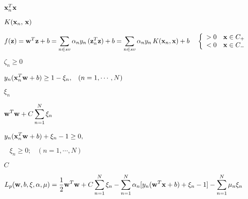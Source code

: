 \documentclass{article}
\def\lthtmlcheckvsize{\ifdim\ht\sizebox<\vsize 
  \ifdim\wd\sizebox<\hsize\expandafter\hfill\fi \expandafter\vfill
  \else\expandafter\vss\fi}%
\begin{document}
{\newpage\clearpage
{}%
$ {\bf x}^T_n{\bf x}$%
\lthtmlindisplaymathZ
\lthtmlcheckvsize\clearpage}

{\newpage\clearpage
{}%
$ K({\bf x}_n,\,{\bf x})$%
\lthtmlindisplaymathZ
\lthtmlcheckvsize\clearpage}

{\newpage\clearpage
{}%
$\displaystyle f({\bf z})={\bf w}^T{\bf z}+b
=\sum_{n\in sv}\alpha_ny_n\,({\bf z}_n^T{\bf z})+b
=\sum_{n\in sv}\alpha_ny_n\,K({\bf x}_n,{\bf x})+b\;\;\;\;
\left\{\begin{array}{ll}>0 & {\bf x}\in C_+\\<0 & {\bf x}\in C_-
\end{array}\right.$%
\lthtmlindisplaymathZ
\lthtmlcheckvsize\clearpage}

{\newpage\clearpage
{}%
$ \zeta_n \ge 0$%
\lthtmlindisplaymathZ
\lthtmlcheckvsize\clearpage}

{\newpage\clearpage
{}%
$\displaystyle y_n ({\bf x}_n^T{\bf w} +b) \ge 1-\xi_n,\;\;\;(n=1,\cdots,N)$%
\lthtmlindisplaymathZ
\lthtmlcheckvsize\clearpage}

{\newpage\clearpage
{}%
$ \xi_n$%
\lthtmlindisplaymathZ
\lthtmlcheckvsize\clearpage}

{\newpage\clearpage
{}%
$\displaystyle {\bf w}^T {\bf w}+C\sum_{n=1}^N \xi_n$%
\lthtmlindisplaymathZ
\lthtmlcheckvsize\clearpage}

{\newpage\clearpage
{}%
$\displaystyle y_n ({\bf x}_n^T {\bf w}+b)+\xi_n-1 \ge 0,
\;\;\;$%
\lthtmlindisplaymathZ
\lthtmlcheckvsize\clearpage}

{\newpage\clearpage
{}%
$\displaystyle \;\;\;\xi_n \ge 0;\;\;\;(n=1,\cdots,N)$%
\lthtmlindisplaymathZ
\lthtmlcheckvsize\clearpage}

{\newpage\clearpage
{}%
$ C$%
\lthtmlindisplaymathZ
\lthtmlcheckvsize\clearpage}

{\newpage\clearpage
{}%
$\displaystyle L_p({\bf w},b,{\bf\xi},{\bf\alpha},{\bf\mu})
=\frac{1}{2}{\bf w}^T{\bf w}+C\sum_{n=1}^N\xi_n
-\sum_{n=1}^N \alpha_n[y_n({\bf w}^T{\bf x}+b)+\xi_n-1]-\sum_{n=1}^N\mu_n\xi_n$%
\lthtmlindisplaymathZ
\lthtmlcheckvsize\clearpage}
\end{document}
